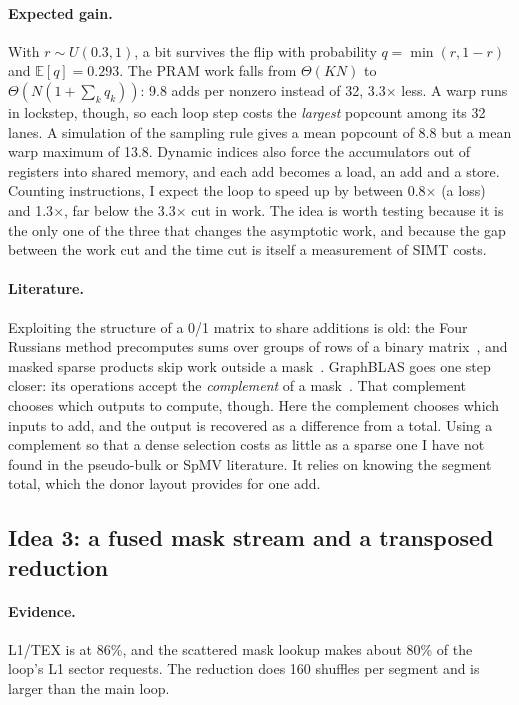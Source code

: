 \documentclass[sigconf,nonacm]{acmart}
\begin{document}
\paragraph{Expected gain.} With $r \sim U(0.3, 1)$, a bit survives the flip with probability
$q = \min(r, 1-r)$ and $\mathbb{E}[q] = 0.293$. The PRAM work falls from $\Theta(KN)$ to
$\Theta(N(1 + \sum_k q_k))$: 9.8 adds per nonzero instead of 32, 3.3$\times$ less. A warp runs in
lockstep, though, so each loop step costs the \emph{largest} popcount among its 32 lanes. A simulation
of the sampling rule gives a mean popcount of 8.8 but a mean warp maximum of 13.8. Dynamic indices also
force the accumulators out of registers into shared memory, and each add becomes a load, an add and a
store. Counting instructions, I expect the loop to speed up by between 0.8$\times$ (a loss) and
1.3$\times$, far below the 3.3$\times$ cut in work. The idea is worth testing because it is the only
one of the three that changes the asymptotic work, and because the gap between the work cut and the
time cut is itself a measurement of SIMT costs.

\paragraph{Literature.} Exploiting the structure of a 0/1 matrix to share additions is old: the Four
Russians method precomputes sums over groups of rows of a binary matrix~\cite{arlazarov1970}, and masked sparse products skip work outside a mask~\cite{milakovic2022}. GraphBLAS goes one step
closer: its operations accept the \emph{complement} of a mask~\cite{buluc2017}. That complement chooses
which outputs to compute, though. Here the complement chooses which inputs to add, and the output is
recovered as a difference from a total. Using a complement so that a
dense selection costs as little as a sparse one I have not found in the pseudo-bulk or SpMV literature.
It relies on knowing the segment total, which the donor layout provides for one add.

\subsection{Idea 3: a fused mask stream and a transposed reduction}

\paragraph{Evidence.} L1/TEX is at 86\%, and the scattered mask lookup makes about 80\% of the loop's L1
sector requests. The reduction does 160 shuffles per segment and is larger than the main loop.
\end{document}
